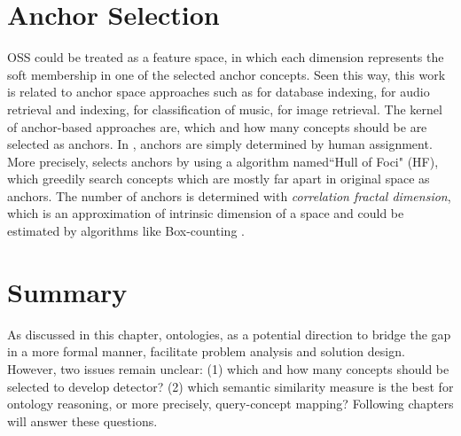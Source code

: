 \section{Anchor Selection} OSS could be treated as a feature space,
in which each dimension represents the soft membership in one of the
selected anchor concepts. Seen this way, this work is related to
anchor space approaches such as
\cite{RobertoF.Santos.Filho:ICDE:2001,CaetanoTraina.Jr.:VLDB:2007}
for database indexing, \cite{Malcolm.Slaney:ICME:2002} for audio
retrieval and indexing, \cite{A.Berenzweig:ICME:2003} for
classification of music, \cite{Jules.Vleugels:PR:2002} for image
retrieval. The kernel of anchor-based approaches are, which and how
many concepts should be are selected as anchors. In
\cite{Malcolm.Slaney:ICME:2002,A.Berenzweig:ICME:2003,Jules.Vleugels:PR:2002},
anchors are simply determined by human assignment. More precisely,
\cite{RobertoF.Santos.Filho:ICDE:2001,CaetanoTraina.Jr.:VLDB:2007}
selects anchors by using a algorithm named``Hull of Foci" (HF),
which greedily search concepts which are mostly far apart in
original space as anchors. The number of anchors is determined with
\emph{correlation fractal dimension}, which is an approximation of
intrinsic dimension of a space and could be estimated by algorithms
like Box-counting
\cite{Christos.Faloutsos:ACMSIGMODICMD:2000,C.Traina.Jr.:XVBSDSBBD:2000}.

\section{Summary}
As discussed in this chapter, ontologies, as a potential direction
to bridge the gap in a more formal manner, facilitate problem
analysis and solution design. However, two issues remain unclear:
(1) which and how many concepts should be selected to develop
detector? (2) which semantic similarity measure is the best for
ontology reasoning, or more precisely, query-concept mapping?
Following chapters will answer these questions.

